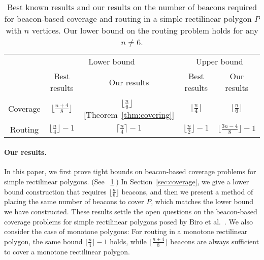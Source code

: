 \documentclass[11pt]{article}
\theoremstyle{definition}
\newcommand\Tstrut{\rule{0pt}{2.6ex}}       \newcommand\Bstrut{\rule[-1.1ex]{0pt}{0pt}}
\begin{document}
\begin{table}[tbh]
\centering
\begin{tabular}{c|c|c|c|c}
 \hline
 & \multicolumn{2}{c|}{Lower bound} & \multicolumn{2}{c}{Upper bound}  \Tstrut\Bstrut\\
 \cline{2-5}
 & Best results & Our results & Best results & Our results
 \Tstrut\Bstrut\\ 
  \hline\hline
 Coverage & $\lfloor \frac{n+4}{8} \rfloor$ \quad\; \cite{bgikm-cccg-13}&
 $\lfloor \frac{n}{6}\rfloor$ \qquad\, [Theorem~\ref{thm:covering}] & $\lfloor \frac{n}{4}\rfloor$ \quad\enspace\;\; \cite{bgikm-cccg-13} & $\lfloor \frac{n}{6}\rfloor$ \qquad\quad{}
  \Tstrut\Bstrut\\ \hline
 Routing & $\lfloor \frac{n}{4}\rfloor-1$  \enspace \cite{bgikm-cccg-13} & $\lceil \frac{n}{4}\rceil -1$  & $\lfloor \frac{n}{2}\rfloor -1$  \enspace \cite{bgikm-cccg-13} &  $\lfloor \frac{3n-4}{8}\rfloor-1$ 
  \Tstrut\Bstrut\\
 \hline
\end{tabular}
\caption{Best known results and our results on the number of beacons required for beacon-based coverage and routing in a simple rectilinear polygon $P$ with $n$ vertices. Our lower bound on the routing problem holds for any $n \neq 6$.}
\label{tbl:summary}
\end{table}

\paragraph{Our results.}

In this paper, we first prove tight bounds on beacon-based coverage problems for simple rectilinear polygons. (See \tablename~\ref{tbl:summary}.) 
In Section~\ref{sec:coverage},
we give a lower bound construction that requires $\lfloor \frac{n}{6} \rfloor$ beacons, and then we present a method of placing the same number of beacons to cover $P$, which matches the lower bound we have constructed.
These results settle the open questions on the beacon-based coverage problems for simple rectilinear polygons
posed by Biro et al.~\cite{bgikm-cccg-13}.
We also consider the case of monotone polygons:
For routing in a monotone rectilinear polygon, the same bound 
$\lfloor \frac{n}{4} \rfloor - 1$ holds,
while $\lfloor \frac{n+4}{8} \rfloor$ beacons are always sufficient to cover a monotone rectilinear polygon.
\end{document}
